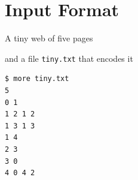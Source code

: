 \documentclass[8pt,a4paper,compress]{beamer}
\begin{document}
\section{Input Format}
\begin{frame}[fragile]
\pause

A tiny web of five pages

\begin{center}
\end{center}

\pause\bigskip

and a file \lstinline{tiny.txt} that encodes it

\smallskip

\begin{lstlisting}[language={},style=focusin]
$ more tiny.txt
5
0 1
1 2 1 2
1 3 1 3
1 4
2 3
3 0
4 0 4 2
\end{lstlisting}
\end{frame}
\end{document}
